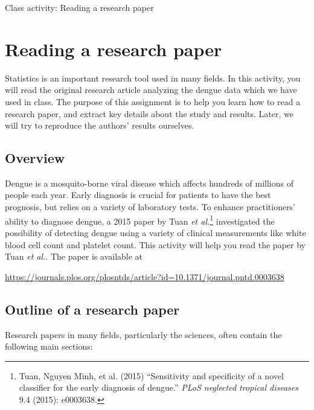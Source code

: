 \documentclass[11pt]{article}
\begin{document}
\begin{center}
\Large
Class activity: Reading a research paper\\
\normalsize
\vspace{5mm}
\end{center}



\section*{Reading a research paper}

Statistics is an important research tool used in many fields. In this activity, you will read the original research article analyzing the dengue data which we have used in class. The purpose of this assignment is to help you learn how to read a research paper, and extract key details about the study and results. Later, we will try to reproduce the authors' results ourselves.

\subsection*{Overview}

Dengue is a mosquito-borne viral disease which affects hundreds of millions of people each year. Early diagnosis is crucial for patients to have the best prognosis, but relies on a variety of laboratory tests. To enhance practitioners' ability to diagnose dengue, a 2015 paper by Tuan \textit{et al.}\footnote{Tuan, Nguyen Minh, et al. (2015) ``Sensitivity and specificity of a novel classifier for the early diagnosis of dengue.'' \textit{PLoS neglected tropical diseases} 9.4 (2015): e0003638.}  investigated the possibility of detecting dengue using a variety of clinical measurements like white blood cell count and platelet count. This activity will help you read the paper by Tuan \textit{et al.}. The paper is available at

\url{https://journals.plos.org/plosntds/article?id=10.1371/journal.pntd.0003638}

\subsection*{Outline of a research paper}

Research papers in many fields, particularly the sciences, often contain the following main sections:
\end{document}
